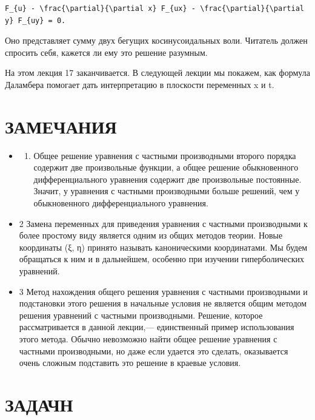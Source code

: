 \documentclass[
  ukrainian,
]{article}
\providecommand{\tightlist}{%
  \setlength{\itemsep}{0pt}\setlength{\parskip}{0pt}}
\begin{document}
\begin{verbatim}
F_{u} - \frac{\partial}{\partial x} F_{ux} - \frac{\partial}{\partial y} F_{uy} = 0.
\end{verbatim}

Оно представляет сумму двух бегущих косинусоидальных воли. Читатель
должен спросить себя, кажется ли ему это решение разумным.

На этом лекция 17 заканчивается. В следующей лекции мы покажем, как
формула Даламбера помогает дать интерпретацию в плоскости переменных x и
t.

\section{ЗАМЕЧАНИЯ}\label{ux437ux430ux43cux435ux447ux430ux43dux438ux44f}

\begin{itemize}
\item
  \begin{enumerate}
  \def\labelenumi{\arabic{enumi}.}
  \tightlist
  \item
    Общее решение уравнения с частными производными второго порядка
    содержит две произвольные функции, а общее решение обыкновенного
    дифференциального уравнения содержит две произвольные постоянные.
    Значит, у уравнения с частными производными больше решений, чем у
    обыкновенного дифференциального уравнения.
  \end{enumerate}
\item
  2 Замена переменных для приведения уравнения с частными производными к
  более простому виду является одним из общих методов теории. Новые
  координаты (ξ, η) принято называть каноническими координатами. Мы
  будем обращаться к ним и в дальнейшем, особенно при изучении
  гиперболических уравнений.
\item
  3 Метод нахождения общего решения уравнения с частными производными и
  подстановки этого решения в начальные условия не является общим
  методом решения уравнений с частными производными. Решение, которое
  рассматривается в данной лекции,--- единственный пример использования
  этого метода. Обычно невозможно найти общее решение уравнения с
  частными производными, но даже если удается это сделать, оказывается
  очень сложным подставить это решение в краевые условия.
\end{itemize}

\section{ЗАДАЧН}\label{ux437ux430ux434ux430ux447ux43d}
\end{document}
